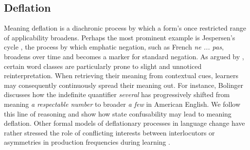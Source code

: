 \documentclass[10pt,a4paper]{article}
\begin{document}
\subsection{Deflation}
Meaning deflation is a diachronic process by which a form's once restricted range of
applicability broadens. Perhaps the most prominent example is Jespersen's cycle
\citep{dahl:1979}, the process by which emphatic negation, such as French {\em ne ... pas},
broadens over time and becomes a marker for standard negation. As argued by
\citet{bolinger:1981}, certain word classes are particularly prone to slight and unnoticed
reinterpretation. When retrieving their meaning from contextual cues, learners
may consequently continuously spread their meaning out. For instance, Bolinger discusses how the indefinite
quantifier {\em several} has progressively shifted from meaning {\em a respectable number} to
broader {\em a few} in American English. We follow this line of reasoning and show how state
confusability may lead to meaning deflation. Other formal models of deflationary processes in
language change have rather stressed the role of conflicting interests between interlocutors
\citep{AhernClark2014:Diachronic-Proc} or asymmetries in production frequencies during learning
\citep{Schaden2012:Modelling-the-A,Deo2015:The-Semantic-an}.
\end{document}
